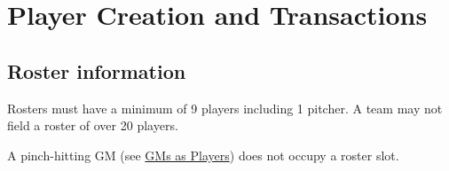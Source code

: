 
\section{Player Creation and Transactions}

\subsection{Roster information}
\begin{deepEnumerate}
	\item Rosters must have a minimum of 9 players including 1 pitcher.	A team may not field a roster of over 20 players.
	\begin{deepEnumerate}
		\item A pinch-hitting GM (see \hyperref[sec:GMs as Players]{GMs as Players}) does not occupy a roster slot.
	\end{deepEnumerate}
\end{deepEnumerate}

